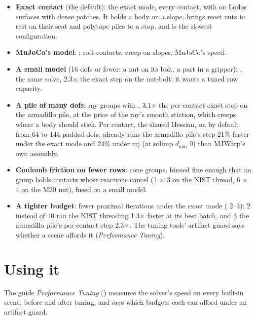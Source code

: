 \begin{itemize}
\item \textbf{Exact contact} (the default): the exact mode, every contact, with  on Lodos surfaces with dense patches. It holds a body on a slope, brings most nuts to rest on their seat and polytope piles to a stop, and is the slowest configuration.
\item \textbf{MuJoCo's model}: ; soft contacts, creep on slopes, MuJoCo's speed.
\item \textbf{A small model} (16 dofs or fewer: a nut on its bolt, a part in a gripper): , the same solve, 2.3$\times$ the exact step on the nut-bolt; it wants a tuned row capacity.
\item \textbf{A pile of many dofs}: ray groups with , 3.1$\times$ the per-contact exact step on the armadillo pile, at the price of the ray's smooth stiction, which creeps where a body should stick. Per contact, the shared Hessian, on by default from 64 to 144 padded dofs, already runs the armadillo pile's step 21\% faster under the exact mode and 24\% under mj (at solimp $d_{\min}$ 0) than MJWarp's own assembly.
\item \textbf{Coulomb friction on fewer rows}: cone groups, binned fine enough that no group holds contacts whose reactions cancel (1 $\times$ 3 on the NIST thread, 6 $\times$ 4 on the M20 nut), fused on a small model.
\item \textbf{A tighter budget}: fewer proximal iterations under the exact mode ( 2--3): 2 instead of 10 ran the NIST threading 1.3$\times$ faster at its best batch, and 3 the armadillo pile's per-contact step 2.3$\times$. The tuning tools' artifact guard says whether a scene affords it (\emph{Performance Tuning}).
\end{itemize}

\section{Using it}\label{sec:using}

The guide \emph{Performance Tuning} () measures the solver's speed on every built-in scene, before and after tuning, and says which budgets each can afford under an artifact guard.

